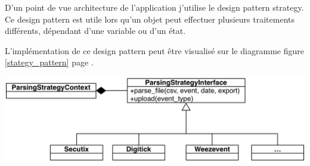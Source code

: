 D'un point de vue architecture de l'application j'utilise le design pattern strategy. Ce design pattern est utile lors qu'un objet peut effectuer plusieurs traitements différents, dépendant d'une variable ou d'un état.

L'implémentation de ce design pattern peut être visualisé sur le diagramme figure \ref{stategy_pattern} page \pageref{dict_csv}.

\begin{center}
\includegraphics[scale=0.75]{Images/StrategyPattern.png}
\label{stategy_pattern}
\end{center}



















